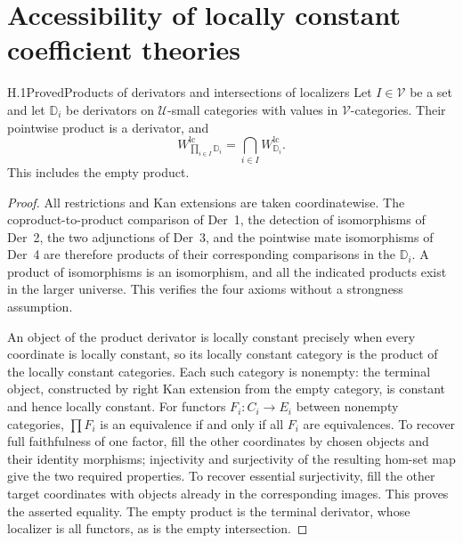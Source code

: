 \section{Accessibility of locally constant coefficient theories}
\providecommand{\sSet}{\mathrm{sSet}}
\providecommand{\cC}{\mathcal C}
\providecommand{\cA}{\mathcal A}
\providecommand{\cU}{\mathcal U}
\providecommand{\cV}{\mathcal V}
\providecommand{\D}{\mathbb D}
\providecommand{\PA}{P_{\mathcal A}}

\begin{claim}{H.1}{Proved}{Products of derivators and intersections of localizers}
Let $I\in\cV$ be a set and let $\D_i$ be derivators on $\cU$-small categories with values in $\cV$-categories. Their pointwise product is a derivator, and
\[
 W^{\mathrm{lc}}_{\prod_{i\in I}\D_i}
 =\bigcap_{i\in I}W^{\mathrm{lc}}_{\D_i}.
\]
This includes the empty product.
\end{claim}
\begin{proof}
All restrictions and Kan extensions are taken coordinatewise. The coproduct-to-product comparison of Der~1, the detection of isomorphisms of Der~2, the two adjunctions of Der~3, and the pointwise mate isomorphisms of Der~4 are therefore products of their corresponding comparisons in the $\D_i$. A product of isomorphisms is an isomorphism, and all the indicated products exist in the larger universe. This verifies the four axioms without a strongness assumption.

An object of the product derivator is locally constant precisely when every coordinate is locally constant, so its locally constant category is the product of the locally constant categories. Each such category is nonempty: the terminal object, constructed by right Kan extension from the empty category, is constant and hence locally constant. For functors $F_i:C_i\to E_i$ between nonempty categories, $\prod F_i$ is an equivalence if and only if all $F_i$ are equivalences. To recover full faithfulness of one factor, fill the other coordinates by chosen objects and their identity morphisms; injectivity and surjectivity of the resulting hom-set map give the two required properties. To recover essential surjectivity, fill the other target coordinates with objects already in the corresponding images. This proves the asserted equality. The empty product is the terminal derivator, whose localizer is all functors, as is the empty intersection.
\end{proof}

